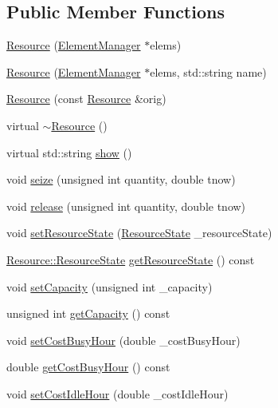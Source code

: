 \subsection*{Public Member Functions}
\begin{DoxyCompactItemize}
\item 
\hyperlink{class_resource_aa0103f22bb6e7f5e85a5cf41f6040103}{Resource} (\hyperlink{class_element_manager}{Element\+Manager} $\ast$elems)
\item 
\hyperlink{class_resource_ae0c082231cd64485af560b51b025d8fe}{Resource} (\hyperlink{class_element_manager}{Element\+Manager} $\ast$elems, std\+::string name)
\item 
\hyperlink{class_resource_a30f2ca8f0617a6628ebd246b14b50566}{Resource} (const \hyperlink{class_resource}{Resource} \&orig)
\item 
virtual \hyperlink{class_resource_a0e5ec475e2601bdb33644468e86f6f10}{$\sim$\+Resource} ()
\item 
virtual std\+::string \hyperlink{class_resource_a593cf83404dc90706943b4e60213fd01}{show} ()
\item 
void \hyperlink{class_resource_a4c9cc891367f2af07511d8897255d625}{seize} (unsigned int quantity, double tnow)
\item 
void \hyperlink{class_resource_ad5da4dca5dd48a4818827e6273c20c2d}{release} (unsigned int quantity, double tnow)
\item 
void \hyperlink{class_resource_aba60047e3a2400f2aec478b1cfa3647e}{set\+Resource\+State} (\hyperlink{class_resource_af2224610b59962683d3cafbdac10621a}{Resource\+State} \+\_\+resource\+State)
\item 
\hyperlink{class_resource_af2224610b59962683d3cafbdac10621a}{Resource\+::\+Resource\+State} \hyperlink{class_resource_ac832a54ae1e20a2f7137aefd3a5fc003}{get\+Resource\+State} () const 
\item 
void \hyperlink{class_resource_aa8530e4507ab493de34feb4fef7d4d03}{set\+Capacity} (unsigned int \+\_\+capacity)
\item 
unsigned int \hyperlink{class_resource_a0aa3a9287571af52be298611580e661e}{get\+Capacity} () const 
\item 
void \hyperlink{class_resource_a28c348f8562fcf63e174229e9001f55c}{set\+Cost\+Busy\+Hour} (double \+\_\+cost\+Busy\+Hour)
\item 
double \hyperlink{class_resource_a66bd7e365c6ccb088afad2a6f24afdae}{get\+Cost\+Busy\+Hour} () const 
\item 
void \hyperlink{class_resource_aee4482e9f914b0b4e83cdb4ada50e45e}{set\+Cost\+Idle\+Hour} (double \+\_\+cost\+Idle\+Hour)

\end{DoxyCompactItemize}
